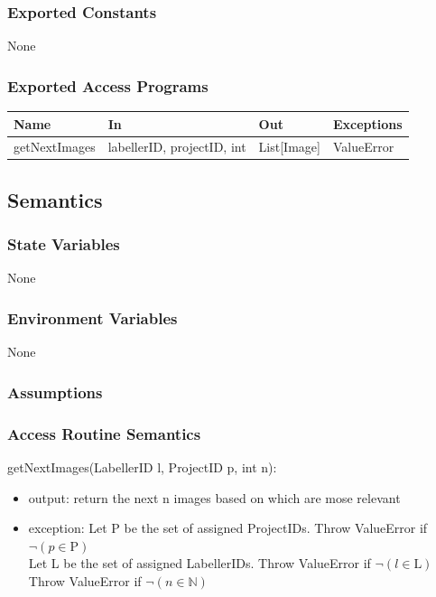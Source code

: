 \documentclass[12pt, titlepage]{article}
\begin{document}
  
  \subsubsection{Exported Constants}
  None
  \subsubsection{Exported Access Programs}
  
  \begin{center}
  \begin{tabular}{p{2cm} p{4cm} p{4cm} p{2cm}}
  \hline
  \textbf{Name} & \textbf{In} & \textbf{Out} & \textbf{Exceptions} \\
  \hline
  getNextImages & labellerID, projectID, int & List[Image] & ValueError \\
  
  \end{tabular}
  \end{center}
  
  \subsection{Semantics}
  
  \subsubsection{State Variables}
  
 None
  
  \subsubsection{Environment Variables}
  
  None
  
  \subsubsection{Assumptions}
  
  
  \subsubsection{Access Routine Semantics}
  
  \noindent getNextImages(LabellerID l, ProjectID p, int n):
  \begin{itemize}
  \item output: return the next n images based on which are mose relevant
  \item exception: Let P be the set of assigned ProjectIDs. Throw ValueError if $\neg (p \in \text{P})$\\
  Let L be the set of assigned LabellerIDs. Throw ValueError if $\neg (l \in \text{L})$\\
  Throw ValueError if $\neg (n \in \mathbb{N})$
  \end{itemize}
\end{document}
